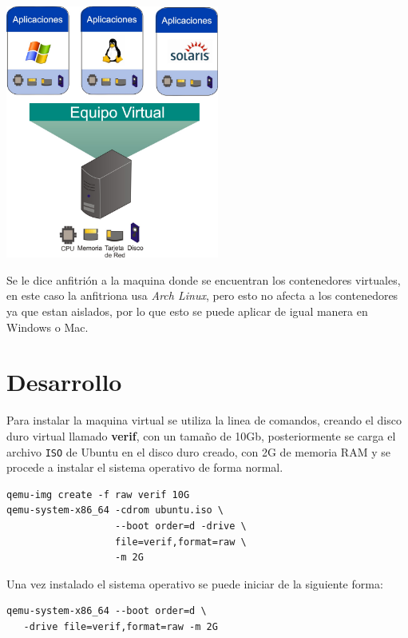\documentclass[11pt]{/home/hao/dev/org/latex-plantilla/IEEEtran}
\begin{document}
\begin{center}
\includegraphics[width=7cm]{virtualizacion.jpg}
\end{center}

Se le dice anfitrión a la maquina donde se encuentran los
contenedores virtuales, en este caso la anfitriona usa \emph{Arch
Linux}, pero esto no afecta a los contenedores ya que estan
aislados, por lo que esto se puede aplicar de igual manera en
Windows o Mac.
\section{Desarrollo}
\label{sec:org144179c}
Para instalar la maquina virtual se utiliza la linea de comandos,
creando el disco duro virtual llamado \textbf{verif}, con un tamaño de
10Gb, posteriormente se carga el archivo \texttt{ISO} de Ubuntu en el disco
duro creado, con 2G de memoria RAM y se procede a instalar el
sistema operativo de forma normal.

\begin{verbatim}
qemu-img create -f raw verif 10G
qemu-system-x86_64 -cdrom ubuntu.iso \
                   --boot order=d -drive \
                   file=verif,format=raw \
                   -m 2G
\end{verbatim}

\newpage
Una vez instalado el sistema operativo se puede iniciar de la
siguiente forma:

\begin{verbatim}
qemu-system-x86_64 --boot order=d \
   -drive file=verif,format=raw -m 2G
\end{verbatim}
\end{document}
